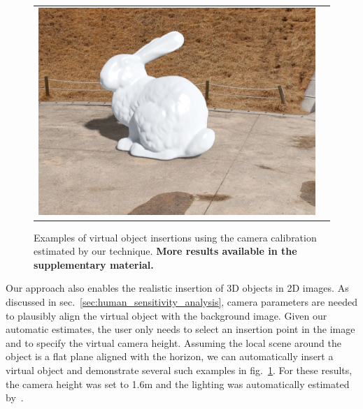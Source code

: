 \begin{figure}
\begin{tabular}{@{}cc@{}}
\includegraphics[width=\voiwidth\linewidth]{figures/applications/virtual_object_insertions/pano_abpebgbgmpccye_jpg-6_5_es.png}
\end{tabular}
\caption{Examples of virtual object insertions using the camera calibration estimated by our technique. \textbf{More results available in the supplementary material.}\vspace{-0.5em}}
\label{fig:applications_virtual_object_insertion}
\end{figure}

Our approach also enables the realistic insertion of 3D objects in 2D images. As discussed in sec.~\ref{sec:human_sensitivity_analysis}, camera parameters are needed to plausibly align the virtual object with the background image. Given our automatic estimates, the user only needs to select an insertion point in the image and to specify the virtual camera height. Assuming the local scene around the object is a flat plane aligned with the horizon, we can automatically insert a virtual object and demonstrate several such examples in fig.~\ref{fig:applications_virtual_object_insertion}. For these results, the camera height was set to 1.6m and the lighting was automatically estimated by~\cite{Hold-Geoffroy2017,Gardner2017}.

